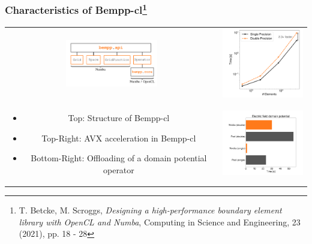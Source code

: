 \documentclass[dvipsnames,10pt]{beamer}
\begin{document}
\begin{frame}
    \frametitle{Characteristics of Bempp-cl\footnote{\tiny T. Betcke, M. Scroggs, \textit{Designing a high-performance boundary element library with OpenCL and Numba}, Computing in Science and Engineering, 23 (2021), pp. 18 - 28}}
    \vspace{-.1cm}
    \begin{center}
        \begin{tabular}{cc}
            \includegraphics[width=4cm]{../figs/bempp_cl_overview.png} & 
            \includegraphics[width=4cm]{../figs/bempp_single_vs_double.png} \\
            \begin{minipage}{5cm}
                \vspace{-3cm}
                \begin{itemize}
                    \item Top: Structure of Bempp-cl
                    \item Top-Right: AVX acceleration in Bempp-cl
                    \item Bottom-Right: Offloading of a domain potential operator
                \end{itemize}
            \end{minipage}&
            \includegraphics[width=4cm]{../figs/gpu_offloading.png} 
        \end{tabular}
    \end{center}
\end{frame}
\end{document}
